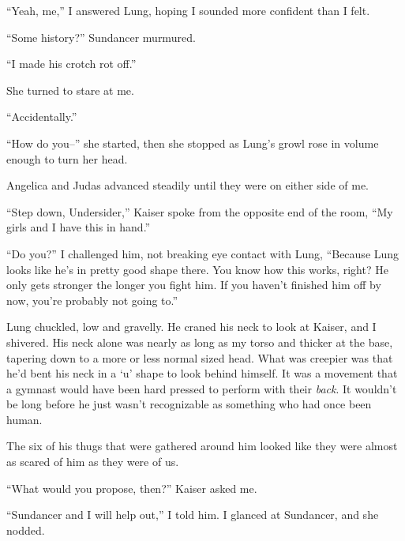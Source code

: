 





``Yeah, me,'' I answered Lung, hoping I sounded more confident than I felt.



``Some history?'' Sundancer murmured.



``I made his crotch rot off.''



She turned to stare at me.



``Accidentally.''



``How do you--'' she started, then she stopped as Lung's growl rose in volume enough to turn her head.



Angelica and Judas advanced steadily until they were on either side of me.



``Step down, Undersider,'' Kaiser spoke from the opposite end of the room, ``My girls and I have this in hand.''



``Do you?'' I challenged him, not breaking eye contact with Lung, ``Because Lung looks like he's in pretty good shape there.  You know how this works, right?  He only gets stronger the longer you fight him.  If you haven't finished him off by now, you're probably not going to.''



Lung chuckled, low and gravelly.  He craned his neck to look at Kaiser, and I shivered.  His neck alone was nearly as long as my torso and thicker at the base, tapering down to a more or less normal sized head.  What was creepier was that he'd bent his neck in a `u' shape to look behind himself.  It was a movement that a gymnast would have been hard pressed to perform with their \emph{back}.  It wouldn't be long before he just wasn't recognizable as something who had once been human.



The six of his thugs that were gathered around him looked like they were almost as scared of him as they were of us.



``What would you propose, then?'' Kaiser asked me.



``Sundancer and I will help out,'' I told him.  I glanced at Sundancer, and she nodded.



